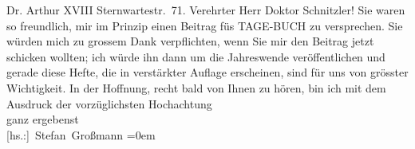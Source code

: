 \begin{ledgroupsized}[t]{13cm}
           \noindent{}\raggedleft{}Dr. Arthur \pend
           \pstart
           \noindent{}\raggedleft{} XVIII\pend
           \pstart
           \noindent{}\raggedleft{}Sternwartestr. 71. \pend
           \pstart\center{}Verehrter Herr Doktor Schnitzler!\pend\pstart
           Sie waren so freundlich, mir im Prinzip einen Beitrag füs TAGE-BUCH zu versprechen. Sie würden mich zu grossem Dank verpflichten, wenn Sie mir den
               Beitrag jetzt schicken wollten; ich würde ihn dann um die Jahreswende veröffentlichen
               und gerade diese Hefte, die in verstärkter Auflage erscheinen, sind für uns von
               grösster Wichtigkeit.\pend
           \pstart
           In der Hoffnung, recht bald von Ihnen zu hören, bin ich mit dem Ausdruck der
               vorzüglichsten\pend
           \pstart
           Hochachtung{\\[\baselineskip]}ganz ergebenst{\\[\baselineskip]}\spacefill\mbox{{[}hs.:{]} Stefan Großmann}\pend
           \leftskip=0em{}
         
         \endnumbering{}\end{ledgroupsized}  \newcommand{\dateiname}{L02456}\newcommand{\titel}{Stefan Großmann an Arthur Schnitzler, 23. 11. 1925}\newcommand{\editorInnen}{ Martin Anton Müller und Gerd-Hermann Susen}
      